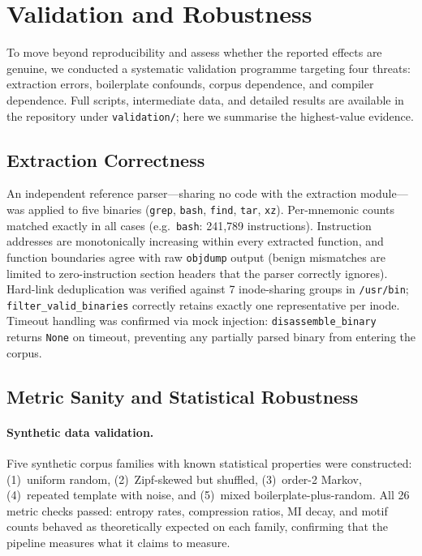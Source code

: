 \documentclass[10pt,twocolumn]{article}
\begin{document}
\section{Validation and Robustness}
\label{sec:validation}

To move beyond reproducibility and assess whether the reported effects are
genuine, we conducted a systematic validation programme targeting four threats:
extraction errors, boilerplate confounds, corpus dependence, and compiler
dependence.  Full scripts, intermediate data, and detailed results are
available in the repository under \texttt{validation/}; here we summarise
the highest-value evidence.

\subsection{Extraction Correctness}

An independent reference parser---sharing no code with the extraction
module---was applied to five binaries (\texttt{grep}, \texttt{bash},
\texttt{find}, \texttt{tar}, \texttt{xz}).  Per-mnemonic counts matched
exactly in all cases (e.g.\ \texttt{bash}: 241,789 instructions).
Instruction addresses are monotonically increasing within every extracted
function, and function boundaries agree with raw \texttt{objdump} output
(benign mismatches are limited to zero-instruction section headers that
the parser correctly ignores).
Hard-link deduplication was verified against 7 inode-sharing groups in
\texttt{/usr/bin}; \texttt{filter\_valid\_binaries} correctly retains
exactly one representative per inode.  Timeout handling was confirmed via
mock injection: \texttt{disassemble\_binary} returns \texttt{None} on
timeout, preventing any partially parsed binary from entering the corpus.

\subsection{Metric Sanity and Statistical Robustness}

\paragraph{Synthetic data validation.}
Five synthetic corpus families with known statistical properties were
constructed: (1)~uniform random, (2)~Zipf-skewed but shuffled,
(3)~order-2 Markov, (4)~repeated template with noise, and (5)~mixed
boilerplate-plus-random.  All 26 metric checks passed: entropy rates,
compression ratios, MI decay, and motif counts behaved as theoretically
expected on each family, confirming that the pipeline measures what it
claims to measure.
\end{document}
